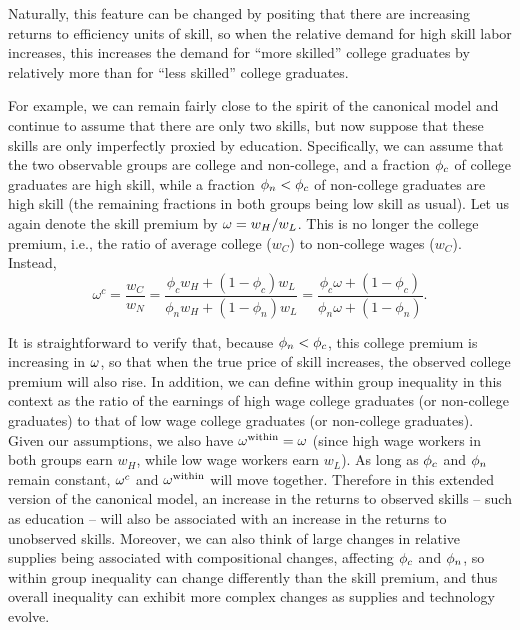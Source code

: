 \documentclass[12pt]{article}
\newcommand{\highlightP}[1]{{\emph{\color{MyPink}{#1}}}}
\theoremstyle{definition}
\begin{document}
Naturally, this feature can be changed by positing that there are increasing returns to efficiency units of skill, so when the relative demand for high skill labor increases, this increases the demand for ``more skilled'' college graduates by relatively more than for ``less skilled'' college graduates. \highlightP{One way to incorporate this idea is to extend the canonical model by drawing a distinction between observable groups (such as college vs. non-college) and skills.} 

For example, we can remain fairly close to the spirit of the canonical model and continue to assume that there are only two skills, but now suppose that these skills are only imperfectly proxied by education. Specifically, we can assume that the two observable groups are college and non-college, and a fraction $\phi_c$ of college graduates are high skill, while a fraction $\phi_n < \phi_c$ of non-college graduates are high skill (the remaining fractions in both groups being low skill as usual). Let us again denote the skill premium by $\omega = w_H / w_L$. This is no longer the college premium, i.e., the ratio of average college ($w_C$) to non-college wages ($w_C$). Instead, 
$$
\omega^c=\frac{w_C}{w_N}=\frac{\phi_c w_H+\left(1-\phi_c\right) w_L}{\phi_n w_H+\left(1-\phi_n\right) w_L}=\frac{\phi_c \omega+\left(1-\phi_c\right)}{\phi_n \omega+\left(1-\phi_n\right)} .
$$

It is straightforward to verify that, because $\phi_n < \phi_c$, this college premium is increasing in $\omega$, so that when the true price of skill increases, the observed college premium will also rise. In addition, we can define within group inequality in this context as the ratio of the earnings of high wage college graduates (or non-college graduates) to that of low wage college graduates (or non-college graduates). Given our assumptions, we also have $\omega^{\text{within}} = \omega$ (since high wage workers in both groups earn $w_H$, while low wage workers earn $w_L$). As long as $\phi_c$ and $\phi_n$ remain constant, $\omega^c$ and $\omega^{\text{within}}$ will move together. Therefore in this extended version of the canonical model, an increase in the returns to observed skills -- such as education -- will also be associated with an increase in the returns to unobserved skills. Moreover, we can also think of large changes in relative supplies being associated with compositional changes, affecting $\phi_c$ and $\phi_n$, so within group inequality can change differently than the skill premium, and thus overall inequality can exhibit more complex changes as supplies and technology evolve.
\end{document}
